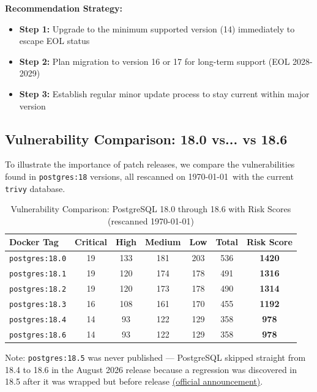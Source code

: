 \documentclass[11pt, a4paper]{article}
\begin{document}
\textbf{Recommendation Strategy:}
\begin{itemize}
    \item \textbf{Step 1:} Upgrade to the minimum supported version (14) immediately to escape EOL status
    \item \textbf{Step 2:} Plan migration to version 16 or 17 for long-term support (EOL 2028-2029)
    \item \textbf{Step 3:} Establish regular minor update process to stay current within major version
\end{itemize}


\subsection{Vulnerability Comparison: 18.0 vs... vs 18.6}
\label{subsec:patch-comparison}

To illustrate the importance of patch releases, we compare the vulnerabilities found in \texttt{postgres:18} versions, all rescanned on \today\ with the current \texttt{trivy} database.

\begin{table}[htbp]
\centering
\caption{Vulnerability Comparison: PostgreSQL 18.0 through 18.6 with Risk Scores (rescanned \today)}
\label{tab:trivy-compare}
\begin{tabular}{@{}lcccccc@{}}
	\textbf{Docker Tag} & \textbf{Critical} & \textbf{High} & \textbf{Medium} & \textbf{Low} & \textbf{Total} & \textbf{Risk Score} \\ \midrule
\rowcolor{lightred} \texttt{postgres:18.0} & 19 & 133 & 181 & 203 & 536 & \textbf{1420} \\
\rowcolor{lightorange} \texttt{postgres:18.1} & 19 & 120 & 174 & 178 & 491 & \textbf{1316} \\
\rowcolor{lightorange} \texttt{postgres:18.2} & 19 & 120 & 173 & 178 & 490 & \textbf{1314} \\
\rowcolor{lightorange} \texttt{postgres:18.3} & 16 & 108 & 161 & 170 & 455 & \textbf{1192} \\
\rowcolor{lightgreen} \texttt{postgres:18.4} & 14 & 93 & 122 & 129 & 358 & \textbf{978} \\
\rowcolor{lightgreen} \texttt{postgres:18.6} & 14 & 93 & 122 & 129 & 358 & \textbf{978} \\
\bottomrule
\end{tabular}
\end{table}

\footnotesize Note: \texttt{postgres:18.5} was never published --- PostgreSQL skipped straight from 18.4 to 18.6 in the August 2026 release because a regression was discovered in 18.5 after it was wrapped but before release \href{https://www.postgresql.org/about/news/postgresql-186-1711-1615-1519-1424-and-19-beta-3-released-3365/}{(official announcement)}.\normalsize
\end{document}
